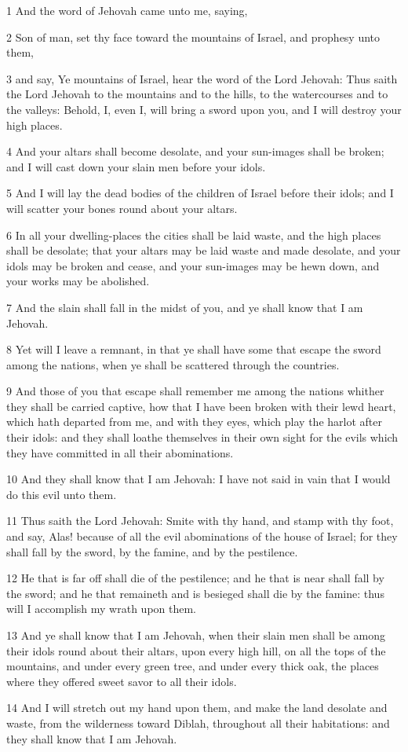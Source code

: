 \par 1 And the word of Jehovah came unto me, saying,
\par 2 Son of man, set thy face toward the mountains of Israel, and prophesy unto them,
\par 3 and say, Ye mountains of Israel, hear the word of the Lord Jehovah: Thus saith the Lord Jehovah to the mountains and to the hills, to the watercourses and to the valleys: Behold, I, even I, will bring a sword upon you, and I will destroy your high places.
\par 4 And your altars shall become desolate, and your sun-images shall be broken; and I will cast down your slain men before your idols.
\par 5 And I will lay the dead bodies of the children of Israel before their idols; and I will scatter your bones round about your altars.
\par 6 In all your dwelling-places the cities shall be laid waste, and the high places shall be desolate; that your altars may be laid waste and made desolate, and your idols may be broken and cease, and your sun-images may be hewn down, and your works may be abolished.
\par 7 And the slain shall fall in the midst of you, and ye shall know that I am Jehovah.
\par 8 Yet will I leave a remnant, in that ye shall have some that escape the sword among the nations, when ye shall be scattered through the countries.
\par 9 And those of you that escape shall remember me among the nations whither they shall be carried captive, how that I have been broken with their lewd heart, which hath departed from me, and with they eyes, which play the harlot after their idols: and they shall loathe themselves in their own sight for the evils which they have committed in all their abominations.
\par 10 And they shall know that I am Jehovah: I have not said in vain that I would do this evil unto them.
\par 11 Thus saith the Lord Jehovah: Smite with thy hand, and stamp with thy foot, and say, Alas! because of all the evil abominations of the house of Israel; for they shall fall by the sword, by the famine, and by the pestilence.
\par 12 He that is far off shall die of the pestilence; and he that is near shall fall by the sword; and he that remaineth and is besieged shall die by the famine: thus will I accomplish my wrath upon them.
\par 13 And ye shall know that I am Jehovah, when their slain men shall be among their idols round about their altars, upon every high hill, on all the tops of the mountains, and under every green tree, and under every thick oak, the places where they offered sweet savor to all their idols.
\par 14 And I will stretch out my hand upon them, and make the land desolate and waste, from the wilderness toward Diblah, throughout all their habitations: and they shall know that I am Jehovah.

